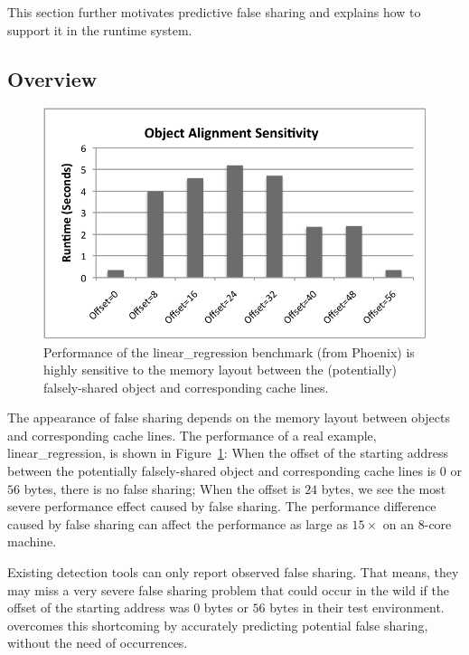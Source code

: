 \label{sec:prediction}
This section further motivates predictive false sharing and explains how to support it in the runtime system.  

\subsection{Overview}
\label{sec:predictoverview}

\begin{figure}[!t]
\begin{center}
\includegraphics[width=6in]{predator/figure/perfsensitive}
\end{center}
\caption{
Performance of the linear\_regression benchmark (from Phoenix)  is highly sensitive to the memory layout between the (potentially) falsely-shared object and corresponding cache lines. 
\label{fig:perfsensitive}}
\end{figure}

The appearance of false sharing depends on 
the memory layout between objects and corresponding cache lines. The performance of a real example, linear\_regression, is shown in Figure~\ref{fig:perfsensitive}: 
When the offset of the starting address between the potentially falsely-shared object and corresponding cache lines is $0$ or $56$ bytes, there is no false sharing; 
When the offset is $24$ bytes, we see the most severe performance effect caused by false sharing. 
The performance difference caused by false sharing can affect the performance as large as $15\times$ on an 8-core machine. 

Existing detection tools can only report observed false sharing. That means, they may miss a very severe false sharing problem that could occur in the wild if the offset of the starting address was $0$ bytes or $56$ bytes in their test environment.
\Predator{} overcomes this shortcoming by accurately predicting potential false sharing, without the need of occurrences. 

